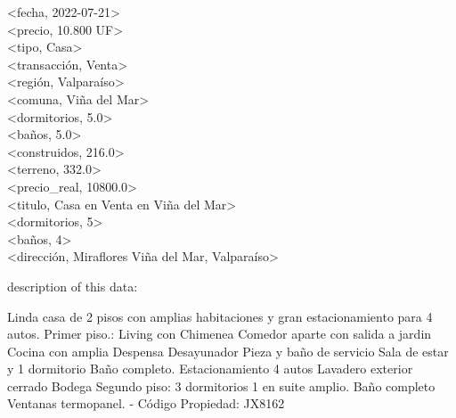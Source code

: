 \begin{tcolorbox}[colback=white,colframe=black!50!white,title=Input]
<fecha, 2022-07-21>\\
<precio, 10.800 UF>\\
<tipo, Casa>\\
<transacción, Venta>\\
<región, Valparaíso>\\
<comuna, Viña del Mar>\\
<dormitorios, 5.0>\\
<baños, 5.0>\\
<construidos, 216.0>\\
<terreno, 332.0>\\
<precio\_real, 10800.0>\\
<titulo, Casa en Venta en Viña del Mar>\\
<dormitorios, 5>\\
<baños, 4>\\
<dirección, Miraflores Viña del Mar, Valparaíso>
\end{tcolorbox}
\begin{tcolorbox}[colback=white,colframe=black!50!white,title=Tarea]
description of this data:
\end{tcolorbox}
\begin{tcolorbox}[colback=white,colframe=black!50!white,title=Respuesta esperada]
Linda casa de 2 pisos con amplias habitaciones y gran estacionamiento para 4 autos. Primer piso.: Living con Chimenea Comedor aparte con salida a jardin Cocina con amplia Despensa Desayunador Pieza y ba\~no de servicio Sala de estar y 1 dormitorio Ba\~no completo. Estacionamiento 4 autos  Lavadero exterior cerrado  Bodega Segundo piso: 3 dormitorios 1 en suite amplio. Ba\~no completo Ventanas termopanel. - C\'odigo Propiedad: JX8162
\end{tcolorbox}
    

